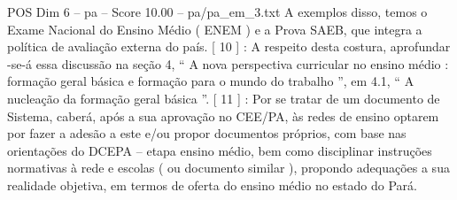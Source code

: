 \begin{textsample}{POS Dim 6 – pa – Score 10.00 – pa/pa\_em\_3.txt}
A exemplos disso, temos o Exame Nacional do Ensino Médio ( ENEM ) e a Prova SAEB, que integra a política de avaliação externa do país. [ 10 ] : A respeito desta costura, aprofundar -se-á essa discussão na seção 4, “ A nova perspectiva curricular no ensino médio : formação geral básica e formação para o mundo do trabalho ”, em 4.1, “ A nucleação da formação geral básica ”. [ 11 ] : Por se tratar de um documento de Sistema, caberá, após a sua aprovação no CEE/PA, às redes de ensino optarem por fazer a adesão a este e/ou propor documentos próprios, com base nas orientações do DCEPA – etapa ensino médio, bem como disciplinar instruções normativas à rede e escolas ( ou documento similar ), propondo adequações a sua realidade objetiva, em termos de oferta do ensino médio no estado do Pará.

\end{textsample}
